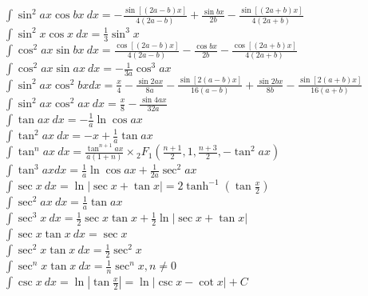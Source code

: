 \documentclass[10pt,letterpaper,landscape]{cheatsheet}
\begin{document}
$
\int \sin^2 ax \cos bx\ dx = 
-\frac{\sin[(2a-b)x]}{4(2a-b)} 
+ \frac{\sin bx}{2b} 
- \frac{\sin[(2a+b)x]}{4(2a+b)}
$\\

$
\int \sin^2 x \cos x\ dx = \frac{1}{3} \sin^3 x
$\\

$
\int \cos^2 ax \sin bx\ dx = \frac{\cos[(2a-b)x]}{4(2a-b)} 
- \frac{\cos bx}{2b}
 - \frac{\cos[(2a+b)x]}{4(2a+b)}
$\\

$
\int \cos^2 ax \sin ax\ dx = -\frac{1}{3a}\cos^3{ax} 
$\\

$
\int \sin^2 ax \cos^2 bx dx = \frac{x}{4}
-\frac{\sin 2ax}{8a}-
\frac{\sin[2(a-b)x]}{16(a-b)}
+\frac{\sin 2bx}{8b}-
\frac{\sin[2(a+b)x]}{16(a+b)}
$\\

$
\int \sin^2 ax \cos^2 ax\ dx = \frac{x}{8}-\frac{\sin 4ax}{32a}
$\\

$
\int \tan ax\ dx = -\frac{1}{a} \ln \cos ax 
$\\

$
\int \tan^2 ax\ dx = -x + \frac{1}{a} \tan ax 
$\\

$
\int \tan^n ax\ dx = 
\frac{\tan^{n+1} ax }{a(1+n)} \times
 {_2}F_1\left( \frac{n+1}{2}, 
1, \frac{n+3}{2}, -\tan^2 ax \right) 
$\\

$
\int \tan^3 ax dx = \frac{1}{a} \ln \cos ax + \frac{1}{2a}\sec^2 ax 
$\\

$
\int \sec x \ dx = \ln | \sec x + \tan x | = 2 \tanh^{-1} \left(\tan \frac{x}{2} \right) 
$\\

$
\int \sec^2 ax\ dx = \frac{1}{a} \tan ax 
$\\

$
\int \sec^3 x \ {dx} = \frac{1}{2} \sec x \tan x + \frac{1}{2}\ln | \sec x + \tan x |
$\\

$
\int \sec x \tan x\ dx = \sec x 
$\\

$
\int \sec^2 x \tan x\ dx = \frac{1}{2} \sec^2 x 
$\\

$
\int \sec^n x \tan x \ dx = \frac{1}{n} \sec^n x , n\ne 0
$\\

$
\int \csc x\ dx = \ln \left| \tan \frac{x}{2} \right|  = \ln | \csc x - \cot x| + C
$\\
\end{document}

